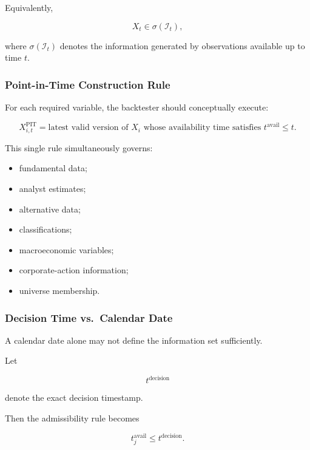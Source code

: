\documentclass[11pt,a4paper]{article}
\begin{document}
Equivalently,

\begin{equation}
X_t
\in
\sigma(\mathcal{I}_t),
\end{equation}

where $\sigma(\mathcal{I}_t)$ denotes the information generated by observations
available up to time $t$.


\subsubsection{Point-in-Time Construction Rule}

For each required variable, the backtester should conceptually execute:

\begin{equation}
\boxed{
X_{i,t}^{\mathrm{PIT}}
=
\text{latest valid version of }
X_i
\text{ whose availability time satisfies }
t^{\mathrm{avail}}\leq t.
}
\end{equation}

This single rule simultaneously governs:

\begin{itemize}
    \item fundamental data;
    \item analyst estimates;
    \item alternative data;
    \item classifications;
    \item macroeconomic variables;
    \item corporate-action information;
    \item universe membership.
\end{itemize}


\subsubsection{Decision Time vs.\ Calendar Date}

A calendar date alone may not define the information set sufficiently.

Let

\begin{equation}
t^{\mathrm{decision}}
\end{equation}

denote the exact decision timestamp.

Then the admissibility rule becomes

\begin{equation}
\boxed{
t_j^{\mathrm{avail}}
\leq
t^{\mathrm{decision}}.
}
\end{equation}
\end{document}
